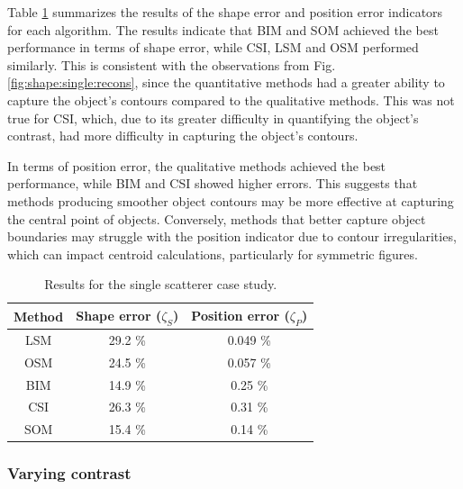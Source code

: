 \documentclass{IEEEtran}
\begin{document}
                Table \ref{tab:star} summarizes the results of the shape error and position error indicators for each algorithm. The results indicate that BIM and SOM achieved the best performance in terms of shape error, while CSI, LSM and OSM performed similarly. This is consistent with the observations from Fig. \ref{fig:shape:single:recons}, since the quantitative methods had a greater ability to capture the object's contours compared to the qualitative methods. This was not true for CSI, which, due to its greater difficulty in quantifying the object's contrast, had more difficulty in capturing the object's contours.        
                
                In terms of position error, the qualitative methods achieved the best performance, while BIM and CSI showed higher errors. This suggests that methods producing smoother object contours may be more effective at capturing the central point of objects. Conversely, methods that better capture object boundaries may struggle with the position indicator due to contour irregularities, which can impact centroid calculations, particularly for symmetric figures.

                \begin{table}[!t]
                    \centering
                    \renewcommand{\arraystretch}{1.5}
                    \caption{Results for the single scatterer case study.}
                    \label{tab:star}
                    \begin{tabular}{ccc}
                        Method & Shape error ($\zeta_S$) & Position error ($\zeta_P$) \\
                        \hline
                        LSM & 29.2 \% & 0.049 \% \\
                        OSM & 24.5 \% & 0.057 \% \\
                        BIM & 14.9 \% & 0.25 \% \\
                        CSI & 26.3 \% & 0.31 \% \\
                        SOM & 15.4 \% & 0.14 \% \\
                    \end{tabular}   
                \end{table}
			
			\subsubsection{Varying contrast}\label{sec:results:shape:varying}
			
\end{document}
